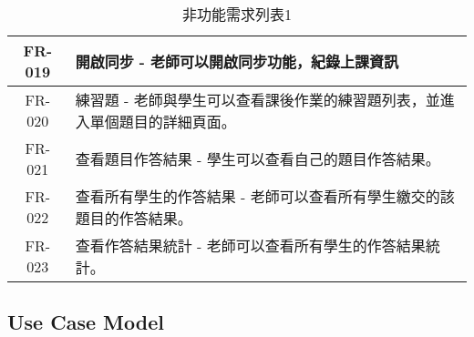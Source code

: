 \documentclass[12pt]{article}
\begin{document}
\begin{table}[H]
\begin{tabular}{|c|p{14.5cm}|}
    FR-019 & 開啟同步 - 老師可以開啟同步功能，紀錄上課資訊 \\  \hline
    FR-020 & 練習題 - 老師與學生可以查看課後作業的練習題列表，並進入單個題目的詳細頁面。\\ \hline
    FR-021 & 查看題目作答結果 - 學生可以查看自己的題目作答結果。 \\ \hline
    FR-022 & 查看所有學生的作答結果 - 老師可以查看所有學生繳交的該題目的作答結果。 \\ \hline 
    FR-023 & 查看作答結果統計 - 老師可以查看所有學生的作答結果統計。 \\ \hline
  \end{tabular}
  \caption{非功能需求列表1}
\end{table}

\subsection{Use Case Model}
\end{document}
